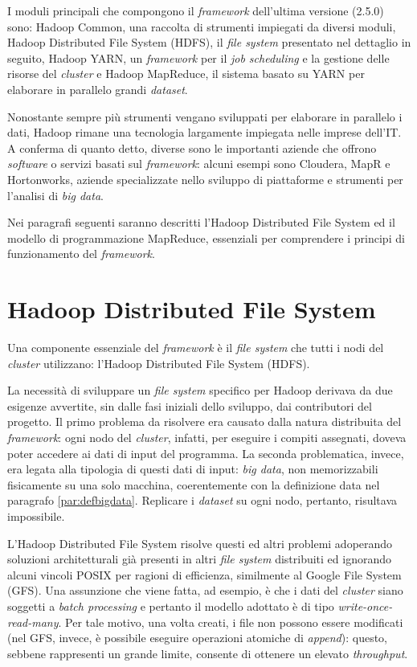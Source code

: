 I moduli principali che compongono il \textit{framework} dell’ultima versione (2.5.0) sono: Hadoop Common, una raccolta di strumenti impiegati da diversi moduli, Hadoop Distributed 
File System (HDFS), il \textit{file system} presentato nel dettaglio in seguito, Hadoop YARN, un \textit{framework} per il \textit{job scheduling} e la gestione delle risorse del \textit{cluster} e Hadoop MapReduce,
il sistema basato su YARN per elaborare in parallelo grandi \textit{dataset}. 

Nonostante sempre più strumenti vengano sviluppati per elaborare in parallelo i dati, Hadoop rimane una tecnologia largamente impiegata nelle imprese dell’IT. A conferma di 
quanto detto, diverse sono le importanti aziende che offrono \textit{software} o servizi basati sul \textit{framework}: alcuni esempi sono Cloudera, MapR e Hortonworks, aziende specializzate 
nello sviluppo di piattaforme e strumenti per l’analisi di \textit{big data}.

Nei paragrafi seguenti saranno descritti l’Hadoop Distributed File System ed il modello di programmazione MapReduce, essenziali per comprendere i principi di funzionamento del \textit{framework}.


\section{Hadoop Distributed File System}
\label{chap:hdfs}

Una componente essenziale del \textit{framework} è il \textit{file system} che tutti i nodi del \textit{cluster} utilizzano: l’Hadoop Distributed File System (HDFS).

La necessità di sviluppare un \textit{file system} specifico per Hadoop derivava da due esigenze avvertite, sin dalle fasi iniziali dello sviluppo, dai contributori del progetto. Il primo 
problema da risolvere era causato dalla natura distribuita del \textit{framework}: ogni nodo del \textit{cluster}, infatti, per eseguire i compiti assegnati, doveva poter accedere ai dati di input 
del programma. La seconda problematica, invece, era legata alla tipologia di questi dati di input: \textit{big data}, non memorizzabili fisicamente su una solo macchina, coerentemente con 
la definizione data nel paragrafo \ref{par:defbigdata}. Replicare i \textit{dataset} su ogni nodo, pertanto, risultava impossibile.

L’Hadoop Distributed File System risolve questi ed altri problemi adoperando soluzioni architetturali già presenti in altri \textit{file system} distribuiti ed ignorando alcuni vincoli POSIX 
per ragioni di efficienza, similmente al Google File System (GFS). Una assunzione che viene fatta, ad esempio, è che i dati del \textit{cluster} siano soggetti a \textit{batch processing} e pertanto
il modello adottato è di tipo \textit{write-once-read-many}. Per tale motivo, una volta creati, i file non possono essere modificati (nel GFS, invece, è possibile eseguire operazioni atomiche 
di \textit{append}): questo, sebbene rappresenti un grande limite, consente di ottenere un elevato \textit{throughput}.

